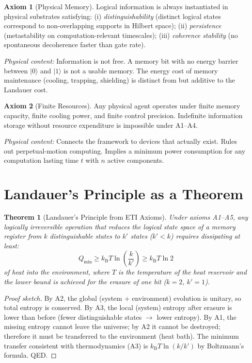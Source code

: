 \documentclass[12pt,letterpaper]{article}
\theoremstyle{plain}
\newtheorem{theorem}{Theorem}[section]
\theoremstyle{definition}
\newtheorem{axiom}{Axiom}
\theoremstyle{remark}
\newcommand{\kB}{k_{\mathrm{B}}}
\begin{document}
\begin{axiom}[Physical Memory]
Logical information is always instantiated in physical substrates
satisfying: (i) \emph{distinguishability} (distinct logical states
correspond to non-overlapping supports in Hilbert space); (ii)
\emph{persistence} (metastability on computation-relevant timescales);
(iii) \emph{coherence stability} (no spontaneous decoherence faster than
gate rate).
\end{axiom}
\textit{Physical content:} Information is not free. A memory bit with no
energy barrier between $|0\rangle$ and $|1\rangle$ is not a usable memory.
The energy cost of memory maintenance (cooling, trapping, shielding) is
distinct from but additive to the Landauer cost.

\begin{axiom}[Finite Resources]
Any physical agent operates under finite memory capacity, finite cooling
power, and finite control precision. Indefinite information storage
without resource expenditure is impossible under A1--A4.
\end{axiom}
\textit{Physical content:} Connects the framework to devices that actually
exist. Rules out perpetual-motion computing. Implies a minimum power
consumption for any computation lasting time $t$ with $n$ active
components.

\section{Landauer's Principle as a Theorem}
\label{sec:landauer_theorem}

\begin{theorem}[Landauer's Principle from ETI Axioms]
\label{thm:landauer}
Under axioms A1--A5, any logically irreversible operation that reduces
the logical state space of a memory register from $k$ distinguishable
states to $k'$ states ($k' < k$) requires dissipating at least:
\begin{equation}
  Q_{\min} \geq \kB T\ln\!\left(\frac{k}{k'}\right) \geq \kB T\ln 2
  \tag{C1.1}
  \label{eq:landauer}
\end{equation}
of heat into the environment, where $T$ is the temperature of the
heat reservoir and the lower bound is achieved for the erasure of one
bit ($k=2$, $k'=1$).
\end{theorem}

\begin{proof}[Proof sketch]
By A2, the global (system + environment) evolution is unitary, so total
entropy is conserved. By A3, the local (system) entropy after erasure is
lower than before (fewer distinguishable states $\to$ lower entropy).
By A1, the missing entropy cannot leave the universe; by A2 it cannot be
destroyed; therefore it must be transferred to the environment (heat
bath). The minimum transfer consistent with thermodynamics (A3) is
$\kB T\ln(k/k')$ by Boltzmann's formula. QED.
\end{proof}
\end{document}
